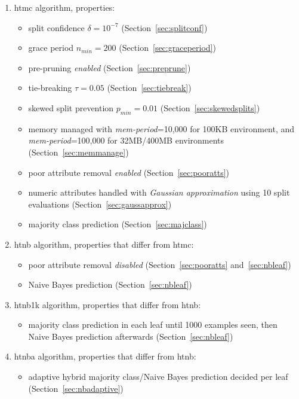 \begin{enumerate}
\item {\sc htmc} algorithm, properties:
\begin{itemize}
\item split confidence $\delta = 10^{-7}$ (Section~\ref{sec:splitconf})
\item grace period $n_{min} = 200$ (Section~\ref{sec:graceperiod})
\item pre-pruning {\em enabled} (Section~\ref{sec:preprune})
\item tie-breaking $\tau = 0.05$ (Section~\ref{sec:tiebreak})
\item skewed split prevention $p_{min} = 0.01$ (Section~\ref{sec:skewedsplits})
\item memory managed with {\em mem-period}=10,000 for 100KB environment, and {\em mem-period}=100,000 for 32MB/400MB environments \\ (Section~\ref{sec:memmanage})
\item poor attribute removal {\em enabled} (Section~\ref{sec:pooratts})
\item numeric attributes handled with {\em Gaussian approximation} using 10 split evaluations (Section~\ref{sec:gaussapprox})
\item majority class prediction (Section~\ref{sec:majclass})
\end{itemize}
\item {\sc htnb} algorithm, properties that differ from {\sc htmc}:
\begin{itemize}
\item poor attribute removal {\em disabled} (Section~\ref{sec:pooratts} and~\ref{sec:nbleaf})
\item Naive Bayes prediction (Section~\ref{sec:nbleaf})
\end{itemize}
\item {\sc htnb1k} algorithm, properties that differ from {\sc htnb}:
\begin{itemize}
\item majority class prediction in each leaf until 1000 examples seen, then Naive Bayes prediction afterwards (Section~\ref{sec:nbleaf})
\end{itemize}
\item {\sc htnba} algorithm, properties that differ from {\sc htnb}:
\begin{itemize}
\item adaptive hybrid majority class/Naive Bayes prediction decided per leaf (Section~\ref{sec:nbadaptive})
\end{itemize}
\end{enumerate}

